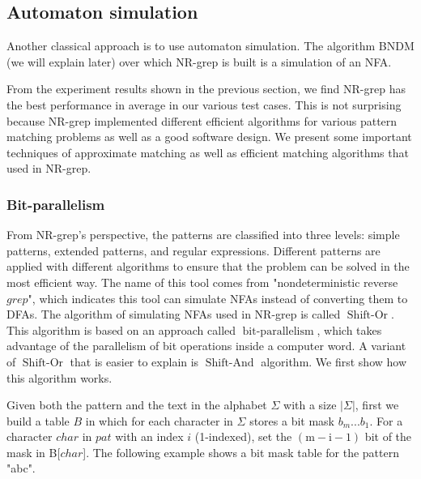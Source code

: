 \subsection{Automaton simulation} \label{survey-NR-grep}
Another classical approach is to use automaton simulation. The algorithm BNDM  (we will explain later) over which NR-grep is built is a simulation of an NFA. 

From the experiment results shown in the previous section, we find NR-grep has the best performance in average in our various test cases. This is not surprising because NR-grep implemented different efficient algorithms for various pattern matching problems as well as a good software design. We present some important techniques of approximate matching as well as efficient matching algorithms that used in NR-grep.

\subsubsection{Bit-parallelism}

From NR-grep's perspective, the patterns are classified into three levels: simple patterns, extended patterns, and regular expressions. Different patterns are applied with different algorithms to ensure that the problem can be solved in the most efficient way. The name of this tool comes from "nondeterministic reverse $grep$", which indicates this tool can simulate NFAs instead of converting them to DFAs. The algorithm of simulating NFAs used in NR-grep is called $\operatorname{Shift-Or}$. This algorithm is based on an approach called $\operatorname{bit-parallelism}$, which takes advantage of the parallelism of bit operations inside a computer word. A variant of $\operatorname{Shift-Or}$ that is easier to explain is $\operatorname{Shift-And}$ algorithm. We first show how this algorithm works. 

Given both the pattern and the text in the alphabet $\Sigma$ with a size $|\Sigma|$, first we build a table $B$ in which for each character in $\Sigma$ stores a bit mask $b_m...b_1$. For a character $char$ in $pat$ with an index $i$ (1-indexed), set the $\operatorname{(m-i-1)}$ bit of the mask in B[$char$]. The following example shows a bit mask table for the pattern "abc".


